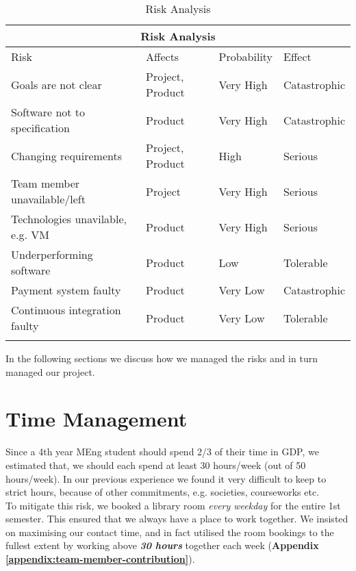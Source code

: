 \begin{center}

\begin{longtable}{ |p{5.7cm}|p{2cm}|p{2.3cm}|p{2.7cm}| }

 \hline
 	\multicolumn{4}{|c|}{Risk Analysis} \\
 \hline
 	Risk & Affects & Probability & Effect  \\
  \hline
 	 Goals are not clear & Project, Product & Very High & Catastrophic \\
   \hline
   Software not to specification & Product & Very High & Catastrophic \\
   \hline
   Changing requirements & Project, Product & High & Serious \\
  \hline
  Team member unavailable/left & Project & Very High & Serious \\
  \hline
  Technologies unavilable, e.g. VM & Product & Very High & Serious \\
  \hline
  Underperforming software & Product & Low & Tolerable \\
  \hline
  Payment system faulty & Product & Very Low & Catastrophic \\
  \hline
  Continuous integration faulty & Product & Very Low & Tolerable \\
  \hline
  \caption{Risk Analysis}
  \label{tab:risk}
\end{longtable}

\end{center}

In the following sections we discuss how we managed the risks and in turn managed our project.

\section{Time Management}
\label{sec:time-management}
Since a 4th year MEng student should spend 2/3 of their time in GDP, we estimated that, we should each spend at least 30 hours/week (out of 50 hours/week). In our previous experience we found it very difficult to keep to strict hours, because of other commitments, e.g. societies, courseworks etc.\\

To mitigate this risk, we booked a library room \textit{every weekday} for the entire 1st semester. This ensured that we always have a place to work together. We insisted on maximising our contact time, and in fact utilised the room bookings to the fullest extent by working above \textit{\textbf{30 hours}} together each week (\textbf{Appendix \ref{appendix:team-member-contribution}}).\\

